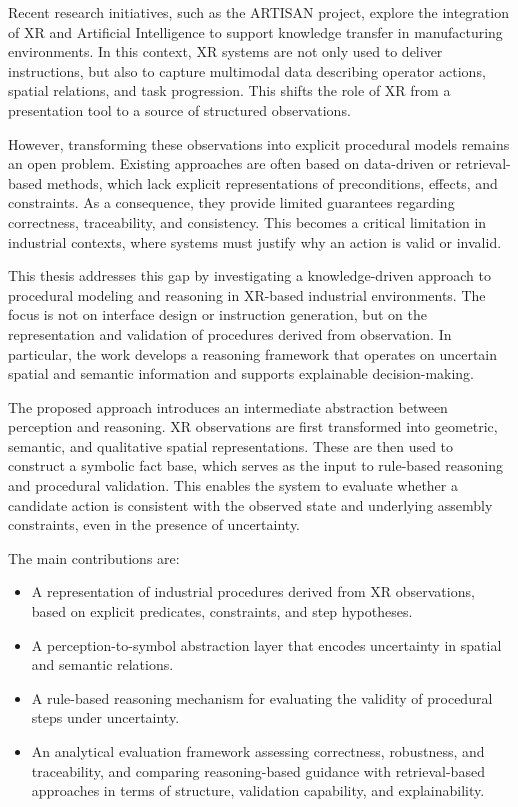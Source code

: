 \documentclass[11pt,titlepage,openright]{book}
\begin{document}
Recent research initiatives, such as the ARTISAN project, explore the integration of XR and Artificial Intelligence to support knowledge transfer in manufacturing environments. In this context, XR systems are not only used to deliver instructions, but also to capture multimodal data describing operator actions, spatial relations, and task progression. This shifts the role of XR from a presentation tool to a source of structured observations.

However, transforming these observations into explicit procedural models remains an open problem. Existing approaches are often based on data-driven or retrieval-based methods, which lack explicit representations of preconditions, effects, and constraints. As a consequence, they provide limited guarantees regarding correctness, traceability, and consistency. This becomes a critical limitation in industrial contexts, where systems must justify why an action is valid or invalid.

This thesis addresses this gap by investigating a knowledge-driven approach to procedural modeling and reasoning in XR-based industrial environments. The focus is not on interface design or instruction generation, but on the representation and validation of procedures derived from observation. In particular, the work develops a reasoning framework that operates on uncertain spatial and semantic information and supports explainable decision-making.

The proposed approach introduces an intermediate abstraction between perception and reasoning. XR observations are first transformed into geometric, semantic, and qualitative spatial representations. These are then used to construct a symbolic fact base, which serves as the input to rule-based reasoning and procedural validation. This enables the system to evaluate whether a candidate action is consistent with the observed state and underlying assembly constraints, even in the presence of uncertainty.

The main contributions are:
\begin{itemize}
\item A representation of industrial procedures derived from XR observations, based on explicit predicates, constraints, and step hypotheses.
\item A perception-to-symbol abstraction layer that encodes uncertainty in spatial and semantic relations.
\item A rule-based reasoning mechanism for evaluating the validity of procedural steps under uncertainty.
\item An analytical evaluation framework assessing correctness, robustness, and traceability, and comparing reasoning-based guidance with retrieval-based approaches in terms of structure, validation capability, and explainability.
\end{itemize}
\end{document}
